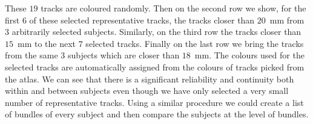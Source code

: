 \documentclass[preprint,authoryear,a4paper,10pt,onecolumn]{elsarticle}
\begin{document}

These $19$ tracks are coloured randomly. Then on the second row
we show, for the first $6$ of these selected representative tracks, the
tracks closer than $20$~mm from $3$ arbitrarily selected
subjects. Similarly, on the third row the tracks closer than $15$~mm to
the next $7$ selected tracks. Finally on the last row we bring the
tracks from the same $3$ subjects which are closer than $18$~mm.  The
colours used for the selected tracks are automatically assigned from the
colours of tracks picked from the atlas. We can see that there is a
significant reliability and continuity both within and between subjects
even though we have only selected a very small number of representative
tracks. Using a similar procedure we could create a list of bundles of
every subject and then compare the subjects at the level of bundles.
\end{document}
